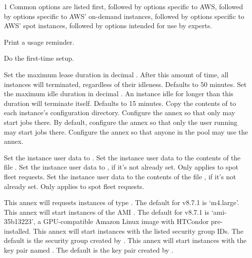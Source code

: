 \begin{ManPage}{\label{man-condor-annex}}{1}
Common options are listed first, followed by options specific to AWS,
followed by options specific to AWS' on-demand instances, followed by
options specific to AWS' spot instances, followed by options intended
for use by experts.

\begin{Options}
		{Print a usage reminder.}

		{Do the first-time setup.}

		{Set the maximum lease duration in decimal .  After this amount of time, all instances will terminated, regardless of their idleness.  Defaults to 50 minutes.}
		{Set the maximum idle duration in decimal .  An instance idle for longer than this duration will terminate itself.  Defaults to 15 minutes.}
		{Copy the contents of  to each instance's configuration directory.}
		{Configure the annex so that only  may start jobs there.  By default, configure the annex so that only the user running  may start jobs there.}
		{Configure the annex so that anyone in the pool may use the annex.}

		{Set the instance user data to .}
		{Set the instance user data to the contents of the file .}
		{Set the instance user data to , if it's not already set.  Only applies to spot fleet requests.}
		{Set the instance user data to the contents of the file , if it's not already set.  Only applies to spot fleet requests.}

		{This annex will requests instances of type .  The default for v8.7.1 is `m4.large'.}
		{This annex will start instances of the AMI .  The default for v8.7.1 is `ami-35b13223', a GPU-compatible Amazon Linux image with HTCondor pre-installed.}
		{This annex will start instances with the listed security group IDs.  The default is the security group created by .}
		{This annex will start instances with the key pair named .  The default is the key pair created by .}


\end{Options}
\end{ManPage}
